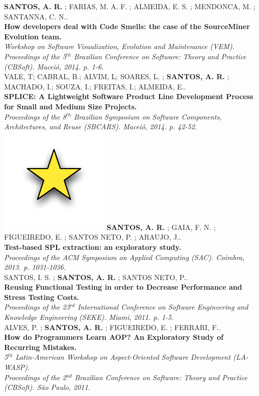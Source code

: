\documentclass[]{friggeri-cv}
\begin{document}
\textbf{SANTOS, A. R.}  ; FARIAS, M. A. F. ; ALMEIDA, E. S. ; MENDONCA, M. ; SANTANNA, C. N..\\ 
 \textbf{How developers deal with Code Smells: the case of the SourceMiner Evolution team.} \\
 \emph{Workshop on Software Visualization, Evolution and Maintenance (VEM).
     Proceedings of the 5$^{th}$ Brazilian Conference on Software: Theory and Practice (CBSoft). Maceió, 2014. p. 1-6.}\\
 
VALE, T; CABRAL, B.; ALVIM, L; SOARES, L. ; \textbf{SANTOS, A. R.} ; MACHADO, I.; SOUZA, I.; FREITAS, I.; ALMEIDA, E..\\
  \textbf{SPLICE: A Lightweight Software Product Line Development Process for Small and Medium Size Projects.} \\
 \emph{Proceedings of the 8$^{th}$ Brazilian Symposium on Software Components, Architectures, and Reuse (SBCARS). Maceió, 2014. p. 42-52.}\\
 
\includegraphics[scale=.15]{img/star.pdf}~\textbf{SANTOS, A. R.}  ; GAIA, F. N. ; FIGUEIREDO, E. ; SANTOS NETO, P. ; ARAUJO, J..\\
  \textbf{Test-based SPL extraction: an exploratory study.} \\
  \emph{Proceedings of the ACM Symposium on Applied Computing (SAC). Coimbra, 2013. p. 1031-1036.}\\
  
 SANTOS, I. S. ; \textbf{SANTOS, A. R.}  ; SANTOS NETO, P..\\
 \textbf{Reusing Functional Testing in order to Decrease Performance and Stress Testing Costs.}\\
 \emph{Proceedings of the 23$^{rd}$ International Conference on Software Engineering and Knowledge Engineering (SEKE). Miami, 2011. p. 1-5.}\\
 
    ALVES, P. ; \textbf{SANTOS, A. R.}  ; FIGUEIREDO, E. ; FERRARI, F..\\
    \textbf{How do Programmers Learn AOP? An Exploratory Study of Recurring Mistakes.} \\
    \emph{5$^{th}$ Latin-American Workshop on Aspect-Oriented Software Development (LA-WASP).\\
         Proceedings of the 2$^{nd}$ Brazilian Conference on Software: Theory and Practice (CBSoft). São Paulo, 2011.}\\
    
\end{document}
